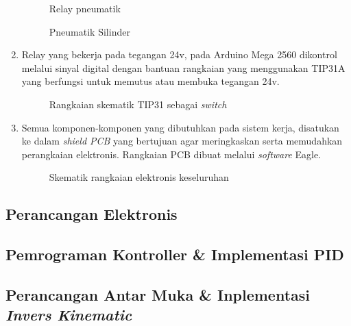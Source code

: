 \begin{enumerate}
		\begin{figure}[H]
			\centering
			\caption{Relay pneumatik}
		\end{figure}
		\begin{figure}[H]
			\centering
			\caption{Pneumatik Silinder}
		\end{figure}
		
		\item Relay yang bekerja pada tegangan 24v, pada Arduino Mega 2560 dikontrol melalui sinyal digital dengan bantuan rangkaian yang menggunakan TIP31A yang berfungsi untuk memutus atau membuka tegangan 24v. 
		\begin{figure}[H]
			\centering
			\caption{Rangkaian skematik TIP31 sebagai \textit{switch}}
		\end{figure}
		
		\item Semua komponen-komponen yang dibutuhkan pada sistem kerja, disatukan ke dalam \textit{shield PCB} yang bertujuan agar meringkaskan serta memudahkan perangkaian elektronis. Rangkaian PCB dibuat melalui \textit{software} Eagle.
		\begin{figure}[H]
			\centering
			\caption{Skematik rangkaian elektronis keseluruhan}
		\end{figure}
		
		
	\end{enumerate}
	\subsection{Perancangan Elektronis}
	
	\subsection{Pemrograman Kontroller \& Implementasi PID}
	
	\subsection{Perancangan Antar Muka \& Inplementasi \textit{Invers Kinematic}}
	